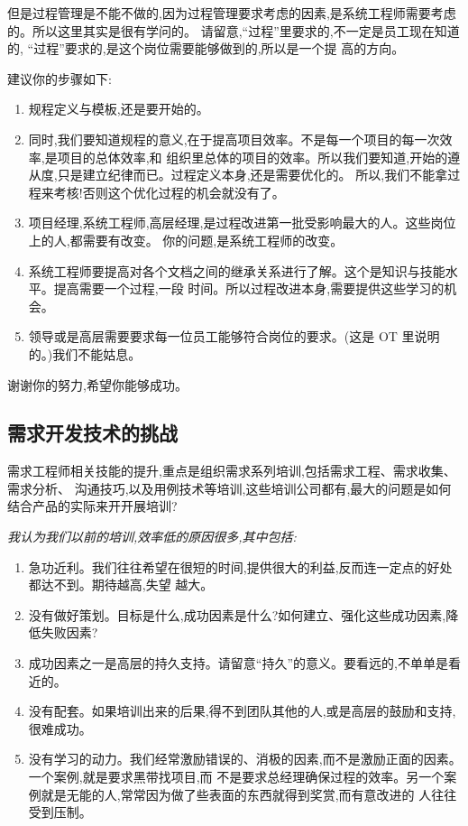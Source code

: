 \documentclass[11pt]{article}
\begin{document}
但是过程管理是不能不做的,因为过程管理要求考虑的因素,是系统工程师需要考虑的。所以这里其实是很有学问的。
请留意,``过程''里要求的,不一定是员工现在知道的, ``过程''要求的,是这个岗位需要能够做到的,所以是一个提
高的方向。

建议你的步骤如下:
\begin{enumerate}
 \item 规程定义与模板,还是要开始的。

 \item 同时,我们要知道规程的意义,在于提高项目效率。不是每一个项目的每一次效率,是项目的总体效率,和
组织里总体的项目的效率。所以我们要知道,开始的遵从度,只是建立纪律而已。过程定义本身,还是需要优化的。
所以,我们不能拿过程来考核!否则这个优化过程的机会就没有了。

 \item 项目经理,系统工程师,高层经理,是过程改进第一批受影响最大的人。这些岗位上的人,都需要有改变。
你的问题,是系统工程师的改变。

 \item 系统工程师要提高对各个文档之间的继承关系进行了解。这个是知识与技能水平。提高需要一个过程,一段
时间。所以过程改进本身,需要提供这些学习的机会。

 \item 领导或是高层需要要求每一位员工能够符合岗位的要求。(这是 OT 里说明的。)我们不能姑息。
\end{enumerate}

谢谢你的努力,希望你能够成功。


\subsection{需求开发技术的挑战}
\qlogo \rmfamily 需求工程师相关技能的提升,重点是组织需求系列培训,包括需求工程、需求收集、需求分析、
沟通技巧,以及用例技术等培训,这些培训公司都有,最大的问题是如何结合产品的实际来开开展培训?

\ylogo \itshape 我认为我们以前的培训,效率低的原因很多,其中包括:

\begin{enumerate}
\item 急功近利。我们往往希望在很短的时间,提供很大的利益,反而连一定点的好处都达不到。期待越高,失望
  越大。
\item 没有做好策划。目标是什么,成功因素是什么?如何建立、强化这些成功因素,降低失败因素?
\item 成功因素之一是高层的持久支持。请留意``持久''的意义。要看远的,不单单是看近的。
\item 没有配套。如果培训出来的后果,得不到团队其他的人,或是高层的鼓励和支持,很难成功。
\item 没有学习的动力。我们经常激励错误的、消极的因素,而不是激励正面的因素。一个案例,就是要求黑带找项目,而
  不是要求总经理确保过程的效率。另一个案例就是无能的人,常常因为做了些表面的东西就得到奖赏,而有意改进的
  人往往受到压制。
\end{enumerate}
\end{document}

